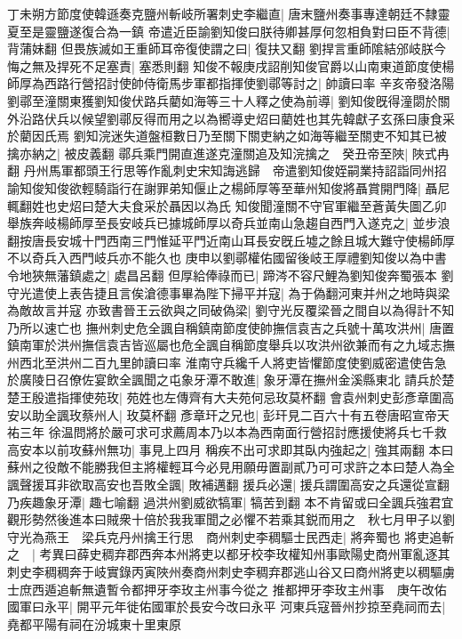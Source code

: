 丁未朔方節度使韓遜奏克鹽州斬岐所署刺史李繼直|{
	唐末鹽州奏事專達朝廷不隸靈夏至是靈鹽遂復合為一鎮}
帝遣近臣諭劉知俊曰朕待卿甚厚何忽相負對曰臣不背德|{
	背蒲妹翻}
但畏族滅如王重師耳帝復使謂之曰|{
	復扶又翻}
劉捍言重師隂結邠岐朕今悔之無及捍死不足塞責|{
	塞悉則翻}
知俊不報庚戌詔削知俊官爵以山南東道節度使楊師厚為西路行營招討使帥侍衛馬步軍都指揮使劉鄩等討之|{
	帥讀曰率}
辛亥帝發洛陽劉鄩至潼關東獲劉知俊伏路兵藺如海等三十人釋之使為前導|{
	劉知俊旣得潼閟於關外沿路伏兵以候望劉鄩反得而用之以為嚮導史炤曰藺姓也其先韓獻子玄孫曰康食采於藺因氏焉}
劉知浣迷失道盤桓數日乃至關下關吏納之如海等繼至關吏不知其已被擒亦納之|{
	被皮義翻}
鄩兵乘門開直進遂克潼關追及知浣擒之　癸丑帝至陜|{
	陜式冉翻}
丹州馬軍都頭王行思等作亂刺史宋知誨逃歸　帝遣劉知俊姪嗣業持詔詣同州招諭知俊知俊欲輕騎詣行在謝罪弟知偃止之楊師厚等至華州知俊將聶賞開門降|{
	聶尼輒翻姓也史炤曰楚大夫食采於聶因以為氏}
知俊聞潼關不守官軍繼至蒼黃失圖乙卯舉族奔岐楊師厚至長安岐兵已據城師厚以奇兵並南山急趨自西門入遂克之|{
	並步浪翻按唐長安城十門西南三門惟延平門近南山耳長安旣丘墟之餘且城大難守使楊師厚不以奇兵入西門岐兵亦不能久也}
庚申以劉鄩權佑國留後岐王厚禮劉知俊以為中書令地狹無藩鎮處之|{
	處昌呂翻}
但厚給俸祿而已|{
	蹄涔不容尺鯉為劉知俊奔蜀張本}
劉守光遣使上表告捷且言俟滄德事畢為陛下掃平并寇|{
	為于偽翻河東并州之地時與梁為敵故言并寇}
亦致書晉王云欲與之同破偽梁|{
	劉守光反覆梁晉之間自以為得計不知乃所以速亡也}
撫州刺史危全諷自稱鎮南節度使帥撫信袁吉之兵號十萬攻洪州|{
	唐置鎮南軍於洪州撫信袁吉皆巡屬也危全諷自稱節度舉兵以攻洪州欲兼而有之九域志撫州西北至洪州二百九里帥讀曰率}
淮南守兵纔千人將吏皆懼節度使劉威密遣使告急於廣陵日召僚佐宴飲全諷聞之屯象牙潭不敢進|{
	象牙潭在撫州金溪縣東北}
請兵於楚楚王殷遣指揮使苑玫|{
	苑姓也左傳齊有大夫苑何忌玫莫杯翻}
會袁州刺史彭彥章圍高安以助全諷玫蔡州人|{
	玫莫杯翻}
彥章玕之兄也|{
	彭玕見二百六十有五卷唐昭宣帝天祐三年}
徐温問將於嚴可求可求薦周本乃以本為西南面行營招討應援使將兵七千救高安本以前攻蘇州無功|{
	事見上四月}
稱疾不出可求即其臥内強起之|{
	強其兩翻}
本曰蘇州之役敵不能勝我但主將權輕耳今必見用願毋置副貳乃可可求許之本曰楚人為全諷聲援耳非欲取高安也吾敗全諷|{
	敗補邁翻}
援兵必還|{
	援兵謂圍高安之兵還從宣翻}
乃疾趣象牙潭|{
	趣七喻翻}
過洪州劉威欲犒軍|{
	犒苦到翻}
本不肯留或曰全諷兵強君宜觀形勢然後進本曰賊衆十倍於我我軍聞之必懼不若乘其鋭而用之　秋七月甲子以劉守光為燕王　梁兵克丹州擒王行思　商州刺史李稠驅士民西走|{
	將奔蜀也}
將吏追斬之　|{
	考異曰薛史稠弃郡西奔本州將吏以都牙校李玫權知州事歐陽史商州軍亂逐其刺史李稠稠奔于岐實錄丙寅陜州奏商州刺史李稠弃郡逃山谷又曰商州將吏以稠驅虜士庶西遁追斬無遺暫令都押牙李玫主州事今從之}
推都押牙李玫主州事　庚午改佑國軍曰永平|{
	開平元年徙佑國軍於長安今改曰永平}
河東兵寇晉州抄掠至堯祠而去|{
	堯都平陽有祠在汾城東十里東原}


